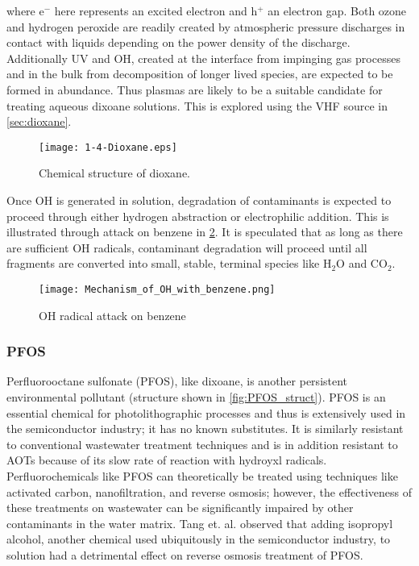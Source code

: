 where e$^-$ here represents an excited electron and h$^+$ an electron gap. Both ozone and hydrogen peroxide are readily created by atmospheric pressure discharges in contact with liquids depending on the power density of the discharge. \cite{Pavlovich2013g} Additionally UV and OH, created at the interface from impinging gas processes and in the bulk from decomposition of longer lived species, are expected to be formed in abundance. \cite{Tian2014} Thus plasmas are likely to be a suitable candidate for treating aqueous dixoane solutions. This is explored using the VHF source in \cref{sec:dioxane}.

\begin{figure}[htbp]
  \centering
  \texttt{[image: 1-4-Dioxane.eps]}
  \caption{Chemical structure of dioxane.}
  \label{fig:diox_struct}
\end{figure}

Once OH is generated in solution, degradation of contaminants is expected to proceed through either hydrogen abstraction or electrophilic addition. This is illustrated through attack on benzene in \cref{fig:benzene_attack}. \cite{solarchem} It is speculated that as long as there are sufficient OH radicals, contaminant degradation will proceed until all fragments are converted into small, stable, terminal species like H$_2$O and CO$_2$.

\begin{figure}[htpb]
  \centering
  \texttt{[image: Mechanism\_of\_OH\_with\_benzene.png]}
  \caption{OH radical attack on benzene}
  \label{fig:benzene_attack}
\end{figure}

\subsubsection{PFOS}

Perfluorooctane sulfonate (PFOS), like dixoane, is another persistent environmental pollutant (structure shown in \cref{fig:PFOS_struct}). \cite{pfosStruct} PFOS is an essential chemical for photolithographic processes and thus is extensively used in the semiconductor industry; it has no known substitutes. \cite{tang2006use} It is similarly resistant to conventional wastewater treatment techniques and is in addition resistant to AOTs because of its slow rate of reaction with hydroyxl radicals. \cite{cheng2008sonochemical} Perfluorochemicals like PFOS can theoretically be treated using techniques like activated carbon, nanofiltration, and reverse osmosis; however, the effectiveness of these treatments on wastewater can be significantly impaired by other contaminants in the water matrix. \cite{tang2006use,tang2007effect} Tang et. al. observed that adding isopropyl alcohol, another chemical used ubiquitously in the semiconductor industry, to solution had a detrimental effect on reverse osmosis treatment of PFOS. \cite{tang2006use}

